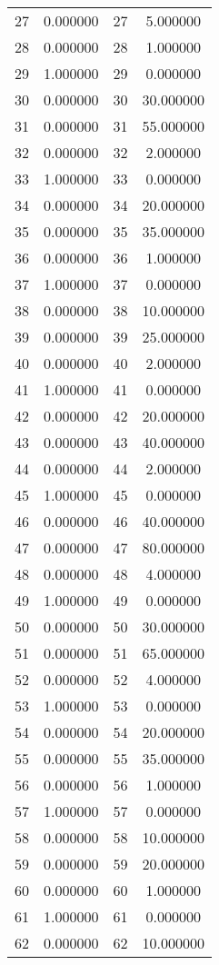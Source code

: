 \documentclass[12pt]{article}
\begin{document}
\begin{longtable}{@{}cccc@{}}
27 & 0.000000 & 27 & 5.000000 \\
28 & 0.000000 & 28 & 1.000000 \\
29 & 1.000000 & 29 & 0.000000 \\
30 & 0.000000 & 30 & 30.000000 \\
31 & 0.000000 & 31 & 55.000000 \\
32 & 0.000000 & 32 & 2.000000 \\
33 & 1.000000 & 33 & 0.000000 \\
34 & 0.000000 & 34 & 20.000000 \\
35 & 0.000000 & 35 & 35.000000 \\
36 & 0.000000 & 36 & 1.000000 \\
37 & 1.000000 & 37 & 0.000000 \\
38 & 0.000000 & 38 & 10.000000 \\
39 & 0.000000 & 39 & 25.000000 \\
40 & 0.000000 & 40 & 2.000000 \\
41 & 1.000000 & 41 & 0.000000 \\
42 & 0.000000 & 42 & 20.000000 \\
43 & 0.000000 & 43 & 40.000000 \\
44 & 0.000000 & 44 & 2.000000 \\
45 & 1.000000 & 45 & 0.000000 \\
46 & 0.000000 & 46 & 40.000000 \\
47 & 0.000000 & 47 & 80.000000 \\
48 & 0.000000 & 48 & 4.000000 \\
49 & 1.000000 & 49 & 0.000000 \\
50 & 0.000000 & 50 & 30.000000 \\
51 & 0.000000 & 51 & 65.000000 \\
52 & 0.000000 & 52 & 4.000000 \\
53 & 1.000000 & 53 & 0.000000 \\
54 & 0.000000 & 54 & 20.000000 \\
55 & 0.000000 & 55 & 35.000000 \\
56 & 0.000000 & 56 & 1.000000 \\
57 & 1.000000 & 57 & 0.000000 \\
58 & 0.000000 & 58 & 10.000000 \\
59 & 0.000000 & 59 & 20.000000 \\
60 & 0.000000 & 60 & 1.000000 \\
61 & 1.000000 & 61 & 0.000000 \\
62 & 0.000000 & 62 & 10.000000 \\

\end{longtable}
\end{document}
